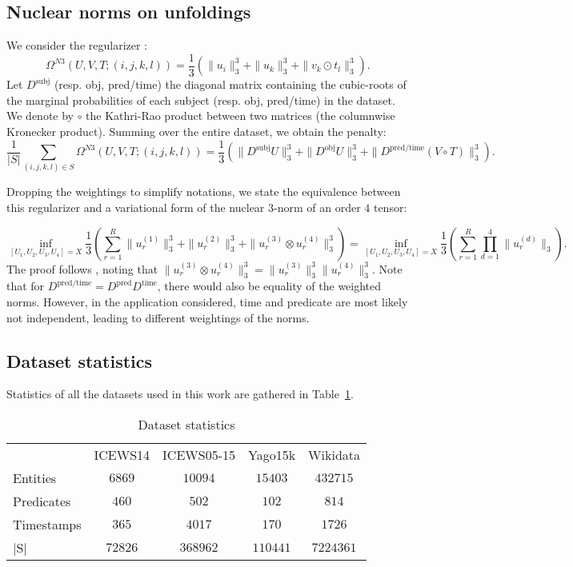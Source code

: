 \documentclass{article}
\begin{document}
\subsection{Nuclear norms on unfoldings}
\label{app:n3_for_4}
We consider the regularizer :
\begin{equation}
\Omega^{N3}(U, V, T; (i,j,k,l)) = \frac{1}{3}\left(\|u_i\|_3^3 + \|u_k\|_3^3 + \|v_k\odot t_l\|_3^3\right).
\end{equation}
Let $D^{\textrm{subj}}$ (resp. obj, pred/time) the diagonal matrix containing the cubic-roots of the marginal probabilities of each subject (resp. obj, pred/time) in the dataset. We denote by $\circ$ the Kathri-Rao product between two matrices (the columnwise Kronecker product). Summing over the entire dataset, we obtain the penalty:
\begin{equation}
\frac{1}{|S|}\sum_{(i,j,k,l)\in S}\Omega^{N3}(U, V, T; (i,j,k,l)) = \frac{1}{3}\left(\|D^{\textrm{subj}}U\|_3^3 + \|D^{\textrm{obj}}U\|_3^3 + \|D^{\textrm{pred/time}}(V \circ T)\|_3^3\right).
\end{equation}

Dropping the weightings to simplify notations, we state the equivalence between this regularizer and a variational form of the nuclear $3$-norm of an order $4$ tensor:

\begin{equation}
    \inf_{[U_1, U_2, U_3, U_4]=X}\frac{1}{3}\left(\sum_{r=1}^R \|u_r^{(1)}\|_3^3 + \|u_r^{(2)}\|_3^3 + \|u_r^{(3)} \otimes u_r^{(4)}\|_3^3\right) = \inf_{[U_1, U_2, U_3, U_4]=X}\frac{1}{3}\left(\sum_{r=1}^R \prod_{d=1}^4\|u_r^{(d)}\|_3\right).
    \label{eq:n3_n4}
\end{equation}
The proof follows \citet{lacroix2018canonical}, noting that $\|u_r^{(3)} \otimes u_r^{(4)}\|_3^3 = \|u_r^{(3)}\|_3^3\| u_r^{(4)}\|_3^3$. Note that for $D^{\textrm{pred/time}}=D^{\textrm{pred}}D^{\textrm{time}}$, there would also be equality of the weighted norms. However, in the application considered, time and predicate are most likely not independent, leading to different weightings of the norms.
\newpage

\subsection{Dataset statistics}
\label{app:statistics}
Statistics of all the datasets used in this work are gathered in Table~\ref{tab:stats}.
\begin{table}[h]
    \centering
    \begin{tabular}{lcccc}
        \toprule
         {} & ICEWS14 & ICEWS05-15 & Yago15k & Wikidata\\
         Entities & $6869$ & $10094$ & $15403$ & $432715$ \\
         Predicates &$460$&$502$&$102$ & $814$  \\
         Timestamps & $365$&$4017$&$170$ & $1726$ \\
         |S| & $72826$&$368962$&$110441$ & $7224361$\\
         \bottomrule
    \end{tabular}
    \caption{Dataset statistics}
    \label{tab:stats}
\end{table}
\end{document}
